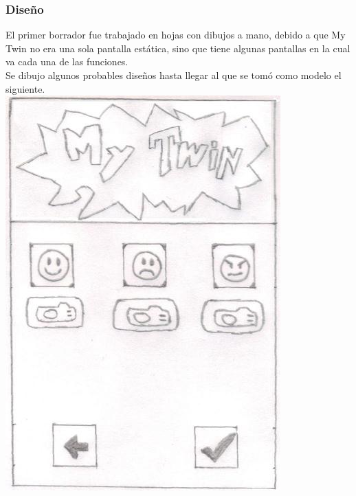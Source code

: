 \documentclass[10pt]{article}
\begin{document}
{{\begin{flushleft}
\end{flushleft}
}

\newpage
\begin{flushleft}
\subsubsection{Dise\~no}
El primer borrador fue trabajado en hojas con dibujos a mano, debido a que My Twin no era una sola pantalla est\'atica, sino que tiene algunas pantallas en la cual va cada una de las funciones.\\
Se dibujo algunos probables dise\~nos hasta llegar al que se tom\'o como modelo el siguiente.\\
\vspace{0.3in}
\includegraphics[scale=0.5]{Twin1}

\end{flushleft}}
\end{document}
